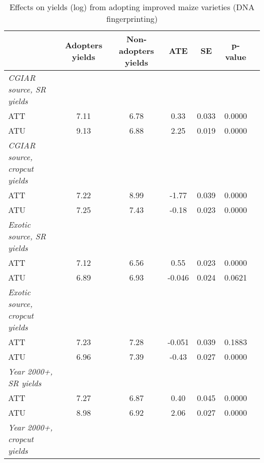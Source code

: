 \begin{table}[H]
\centering
\hspace*{-1.2cm}
\begin{threeparttable}
\caption{Effects on yields (log) from adopting improved maize varieties (DNA fingerprinting)}
\label{tab:switch3}
\begin{tabular}{l cccccc}
\hline
\hline
            &Adopters yields&Non-adopters yields&         ATE&          SE&     p-value\\
\hline
\textit{CGIAR source, SR yields}&            &            &            &            &            \\
ATT         &        7.11&        6.78&        0.33&       0.033&      0.0000\\
%
%
%
ATU         &        9.13&        6.88&        2.25&       0.019&      0.0000\\
%
%
%
\textit{CGIAR source, cropcut yields}&            &            &            &            &            \\
ATT         &        7.22&        8.99&       -1.77&       0.039&      0.0000\\
%
%
%
ATU         &        7.25&        7.43&       -0.18&       0.023&      0.0000\\
%
%
%
\textit{Exotic source, SR yields}&            &            &            &            &            \\
ATT         &        7.12&        6.56&        0.55&       0.023&      0.0000\\
%
%
%
ATU         &        6.89&        6.93&      -0.046&       0.024&      0.0621\\
%
%
%
\textit{Exotic source, cropcut yields}&            &            &            &            &            \\
ATT         &        7.23&        7.28&      -0.051&       0.039&      0.1883\\
%
%
%
ATU         &        6.96&        7.39&       -0.43&       0.027&      0.0000\\
%
%
%
\textit{Year 2000+, SR yields}&            &            &            &            &            \\
ATT         &        7.27&        6.87&        0.40&       0.045&      0.0000\\
%
%
%
ATU         &        8.98&        6.92&        2.06&       0.027&      0.0000\\
%
%
%
\textit{Year 2000+, cropcut yields}&            &            &            &            &            \\

\end{tabular}
\end{threeparttable}
\end{table}
